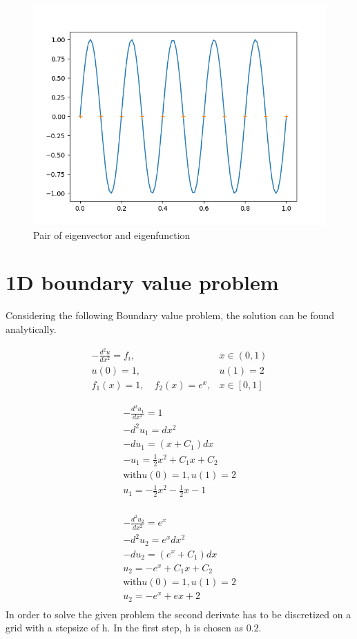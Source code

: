 \documentclass{article}
\begin{document}
\begin{figure}[H]
	\centering
	\includegraphics[width=.9\linewidth]{1thpair.png}
	\caption{ Pair of eigenvector and eigenfunction}
\end{figure}

\section{1D boundary value problem}
Considering the following Boundary value problem, the solution can be found analytically.

\begin{align}
    -\frac{d^{2} u}{d x^{2}}=f_{i}, & x \in(0,1) \\ u(0)=1, & u(1)=2 \\ f_{1}(x)=1, \quad f_{2}(x)=e^{x}, & x \in[0,1]
\end{align}

\begin{align}
    -\frac{d^{2} u_1}{d x^{2}}=1 \\
    - d^2 u_1 = dx^2 \\
    - d u_1 = (x+C_1) dx\\
    - u_1 = \frac{1}{2}x^2 + C_1 x + C_2\\
    \text{with} u(0)=1,  u(1)=2 \\
    u_1 = -\frac{1}{2}x^2 - \frac{1}{2} x - 1\\
\end{align}

\begin{align}
    -\frac{d^{2} u_2}{d x^{2}}=e^x \\
    -d^2 u_2 = e^x dx^2 \\
    -d u_2 = (e^x+C_1) dx\\
    u_2 = -e^x + C_1 x + C_2\\
    \text{with} u(0)=1,  u(1)=2 \\
    u_2 = -e^x + e x + 2\\
\end{align}
In order to solve the given problem the second derivate has to be discretized on a grid with a stepsize of h. In the first step, h is chosen as $0.2$.
\end{document}
